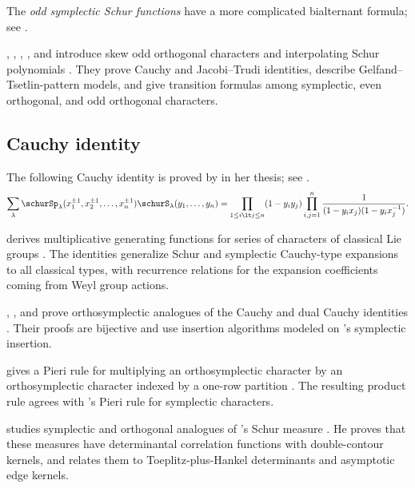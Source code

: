 The \emph{odd symplectic Schur functions} have a more complicated
bialternant formula; see \cite{Okada2020OddSymplectic}.

, , ,
, and  introduce skew odd orthogonal
characters and interpolating Schur polynomials \cite{JingLiPanWangYe2025}.
They prove Cauchy and Jacobi--Trudi identities, describe
Gelfand--Tsetlin-pattern models, and give transition formulas among
symplectic, even orthogonal, and odd orthogonal characters.


\subsection[schurSymplecticCauchy]{Cauchy identity}


The following Cauchy identity is proved by  in her
thesis; see \cite{SundaramThesis}.
\[
\sum_{\lambda} \schurSp_\lambda(x^{\pm 1}_{1},x^{\pm 1}_{2},\dotsc, x^{\pm 1}_{n}) \schurS_\lambda(y_1,\dotsc,y_n)
= \prod_{1\leq i \lt j \leq n} (1-y_i y_j)
\prod_{i,j=1}^{n} \frac{1}{(1-y_i x_j)(1-y_i x^{-1}_j)}.
\]

 derives multiplicative generating
functions for series of characters of classical Lie groups
\cite{King2023x}.  The identities generalize Schur and symplectic Cauchy-type
expansions to all classical types, with recurrence relations for the expansion
coefficients coming from Weyl group actions.

, , and  prove
orthosymplectic analogues of the Cauchy and dual Cauchy identities
\cite{PatelPatelStokke2022}.  Their proofs are bijective and use insertion
algorithms modeled on 's symplectic insertion.

 gives a Pieri rule for multiplying an orthosymplectic
character by an orthosymplectic character indexed by a one-row partition
\cite{Stokke2018}.  The resulting product rule agrees with
's Pieri rule for symplectic characters.

 studies symplectic and orthogonal analogues of
's Schur measure \cite{Betea2018x}.  He proves that
these measures have determinantal correlation functions with double-contour
kernels, and relates them to Toeplitz-plus-Hankel determinants and asymptotic
edge kernels.





